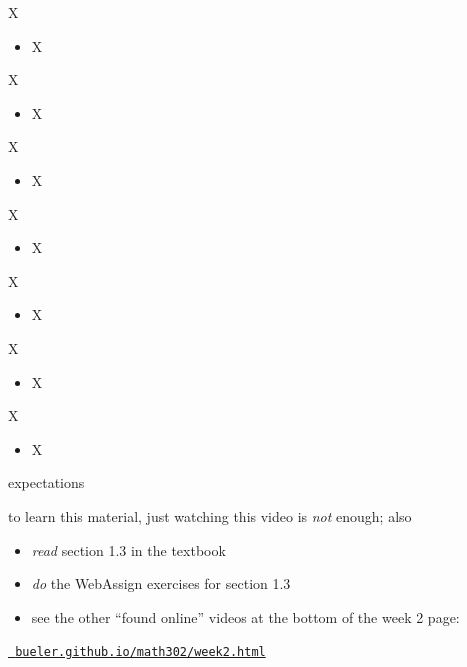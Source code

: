 \documentclass{beamer}
\begin{document}
\begin{frame}{X}

\begin{itemize}
\item X
\end{itemize}
\end{frame}


\begin{frame}{X}

\begin{itemize}
\item X
\end{itemize}
\end{frame}


\begin{frame}{X}

\begin{itemize}
\item X
\end{itemize}
\end{frame}


\begin{frame}{X}

\begin{itemize}
\item X
\end{itemize}
\end{frame}


\begin{frame}{X}

\begin{itemize}
\item X
\end{itemize}
\end{frame}


\begin{frame}{X}

\begin{itemize}
\item X
\end{itemize}
\end{frame}


\begin{frame}{X}

\begin{itemize}
\item X
\end{itemize}
\end{frame}


\begin{frame}{expectations}

to learn this material, just watching this video is \emph{not} enough; also
\begin{itemize}
\item \emph{read} section 1.3 in the textbook
\item \emph{do} the WebAssign exercises for section 1.3
\item see the other ``found online'' videos at the bottom of the week 2 page:
\end{itemize}

\centerline{\href{https://bueler.github.io/math302/week2.html}{\tt \color{cyan} bueler.github.io/math302/week2.html}}
\end{frame}
\end{document}
